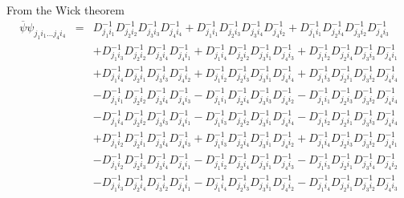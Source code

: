 \documentclass[a4paper,10pt]{report}
\newcommand{\ol}[1]{\overline{#1}}
\newcommand{\ppb}{\ol{\psi}\psi}
\newcommand{\D}{D^{-1}}
\begin{document}
\noindent From the Wick theorem
\begin{eqnarray}
\ppb_{j_1i_1...j_4i_4} &=& \D_{j_1i_1}\D_{j_2i_2}\D_{j_3i_3}\D_{j_4i_4}
			 +  \D_{j_1i_1}\D_{j_2i_3}\D_{j_3i_4}\D_{j_4i_2}
			 +  \D_{j_1i_1}\D_{j_2i_4}\D_{j_3i_2}\D_{j_4i_3}\nonumber\\
		&&	 +  \D_{j_1i_3}\D_{j_2i_2}\D_{j_3i_4}\D_{j_4i_1}
			 +  \D_{j_1i_4}\D_{j_2i_2}\D_{j_3i_1}\D_{j_4i_3}
			 +  \D_{j_1i_2}\D_{j_2i_4}\D_{j_3i_3}\D_{j_4i_1}\nonumber\\
		&&	 +  \D_{j_1i_4}\D_{j_2i_1}\D_{j_3i_3}\D_{j_4i_2}
			 +  \D_{j_1i_2}\D_{j_2i_3}\D_{j_3i_1}\D_{j_4i_4}
			 +  \D_{j_1i_3}\D_{j_2i_1}\D_{j_3i_2}\D_{j_4i_4}\nonumber\\
		&&	 -  \D_{j_1i_1}\D_{j_2i_2}\D_{j_3i_4}\D_{j_4i_3}
			 -  \D_{j_1i_1}\D_{j_2i_4}\D_{j_3i_3}\D_{j_4i_2}
			 -  \D_{j_1i_1}\D_{j_2i_3}\D_{j_3i_2}\D_{j_4i_4}\nonumber\\	 
		&&	 -  \D_{j_1i_4}\D_{j_2i_2}\D_{j_3i_3}\D_{j_4i_1}
			 -  \D_{j_1i_3}\D_{j_2i_2}\D_{j_3i_1}\D_{j_4i_4}
			 -  \D_{j_1i_2}\D_{j_2i_1}\D_{j_3i_3}\D_{j_4i_4}\nonumber\\
		&&	 +  \D_{j_1i_2}\D_{j_2i_1}\D_{j_3i_4}\D_{j_4i_3}
			 +  \D_{j_1i_3}\D_{j_2i_4}\D_{j_3i_1}\D_{j_4i_2}
			 +  \D_{j_1i_4}\D_{j_2i_3}\D_{j_3i_2}\D_{j_4i_1}\nonumber\\
		&&	 -  \D_{j_1i_2}\D_{j_2i_3}\D_{j_3i_4}\D_{j_4i_1}
			 -  \D_{j_1i_2}\D_{j_2i_4}\D_{j_3i_1}\D_{j_4i_3}
			 -  \D_{j_1i_3}\D_{j_2i_1}\D_{j_3i_4}\D_{j_4i_2}\nonumber\\
		&&	 -  \D_{j_1i_3}\D_{j_2i_4}\D_{j_3i_2}\D_{j_4i_1}
			 -  \D_{j_1i_4}\D_{j_2i_3}\D_{j_3i_1}\D_{j_4i_2}
			 -  \D_{j_1i_4}\D_{j_2i_1}\D_{j_3i_2}\D_{j_4i_3}\nonumber
\end{eqnarray}
\end{document}
